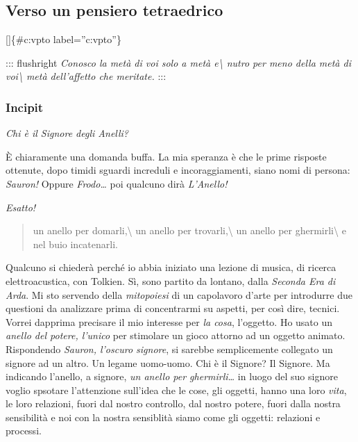 \documentclass[a4paper,11pt]{article}
\begin{document}
\subsection{Verso un pensiero tetraedrico}\hypertarget{verso-un-pensiero-tetraedrico}{}\label{verso-un-pensiero-tetraedrico}

{[}{]}\{\#c:vpto label=''c:vpto''\}

::: flushright
\emph{Conosco la metà di voi solo a metà e\textbackslash{}
nutro per meno della metà di voi\textbackslash{}
metà dell'affetto che meritate.}
:::

\subsubsection{Incipit}\hypertarget{incipit}{}\label{incipit}

\emph{Chi è il Signore degli Anelli?}

È chiaramente una domanda buffa. La mia speranza è che le prime risposte
ottenute, dopo timidi sguardi increduli e incoraggiamenti, siano nomi di
persona: \emph{Sauron!} Oppure \emph{Frodo\ldots{}} poi qualcuno dirà \emph{L'Anello!}

\emph{Esatto!}

\begin{quote}
un anello per domarli,\textbackslash{}
un anello per trovarli,\textbackslash{}
un anello per ghermirli\textbackslash{}
e nel buio incatenarli.
\end{quote}

Qualcuno si chiederà perché io abbia iniziato una lezione di musica, di
ricerca elettroacustica, con Tolkien. Sì, sono partito da lontano, dalla
\emph{Seconda Era di Arda}. Mi sto servendo della \emph{mitopoiesi} di un
capolavoro d'arte per introdurre due questioni da analizzare prima di
concentrarmi su aspetti, per così dire, tecnici. Vorrei dapprima
precisare il mio interesse per \emph{la cosa}, l'oggetto. Ho usato un \emph{anello
del potere, l'unico} per stimolare un gioco attorno ad un oggetto
animato. Rispondendo \emph{Sauron, l'oscuro signore}, si sarebbe
semplicemente collegato un signore ad un altro. Un legame uomo-uomo. Chi
è il Signore? Il Signore. Ma indicando l'anello, a signore, \emph{un anello
per ghermirli\ldots{}} in luogo del suo signore voglio spsotare l'attenzione
sull'idea che le cose, gli oggetti, hanno una loro \emph{vita}, le loro
relazioni, fuori dal nostro controllo, dal nostro potere, fuori dalla
nostra sensibilità e noi con la nostra sensiblità siamo come gli
oggetti: relazioni e processi.
\end{document}
